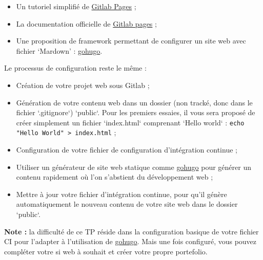\documentclass[11pt,a4paper,oneside]{article}
\begin{document}
\begin{itemize}
	\item Un tutoriel simplifié de \href{https://getpublii.com/docs/host-static-website-gitlab-pages.html}{Gitlab Pages} ;
	\item La documentation officielle de \href{https://docs.gitlab.com/ee/user/project/pages/}{Gitlab pages} ;
	\item Une proposition de framework permettant de configurer un site web avec fichier `Mardown' : \href{https://gohugo.io/documentation/}{gohugo}.
\end{itemize}


\vspace{2mm}
Le processus de configuration reste le même :

\begin{itemize}
	\item Création de votre projet web sous Gitlab ;
	\item Génération de votre contenu web dans un dossier (non tracké, donc dans le fichier `.gitignore`) `public`. Pour les premiers essaies, il vous sera proposé de créer simplement un fichier `index.html` comprenant `Hello world` : \texttt{echo "Hello World" > index.html} ;
	\item Configuration de votre fichier de configuration d'intégration continue ;
	\item Utiliser un générateur de site web statique comme \href{https://gohugo.io/documentation/}{gohugo} pour générer un contenu rapidement où l'on s'abstient du développement web ;
	\item Mettre à jour votre fichier d'intégration continue, pour qu'il génère automatiquement le nouveau contenu de votre site web dans le dossier `public`.
\end{itemize}


\textbf{Note :} la difficulté de ce TP réside dans la configuration basique de votre fichier CI pour l'adapter à l'utilisation de \href{https://gohugo.io/documentation/}{gohugo}. Mais une fois configuré, vous pouvez compléter votre si web à souhait et créer votre propre portefolio.
\end{document}

